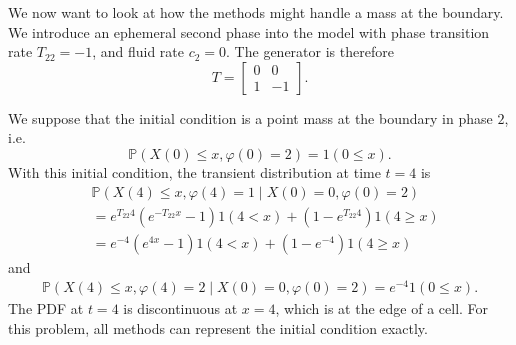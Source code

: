\begin{example}\label{ex: wave 1}
	We now want to look at how the methods might handle a mass at the boundary. We introduce an ephemeral second phase into the model with phase transition rate \(T_{22}=-1\), and fluid rate \(c_2=0\). The generator is therefore 
	\[T=\left[\begin{array}{cc} 0 & 0 \\ 1 & -1 \end{array}\right].\]

	We suppose that the initial condition is a point mass at the boundary in phase \(2\), i.e. \[\mathbb P(X(0)\leq x, \varphi(0)=2)=1(0\leq x).\] 
	With this initial condition, the transient distribution at time \(t=4\) is 
	\begin{align}
		&\mathbb P(X(4)\leq x,\varphi(4)=1 \mid X(0)=0,\varphi(0)=2) \nonumber 
		\\&= e^{T_{22}4}\left(e^{-T_{22}x}-1\right)1(4< x) + (1-e^{T_{22}4})1(4\geq x) \nonumber
		\\&= e^{-4}\left(e^{4x}-1\right)1(4< x) + (1-e^{-4})1(4\geq x) \label{eqn: asjda}
	\end{align}
	and 
	\begin{align}
		\mathbb P(X(4)\leq x,\varphi(4)=2 \mid X(0)=0,\varphi(0)=2) = e^{-4}1(0\leq x).
	\end{align}
	The PDF at \(t=4\) is discontinuous at \(x=4\), which is at the edge of a cell. For this problem, all methods can represent the initial condition exactly. 


\end{example}
